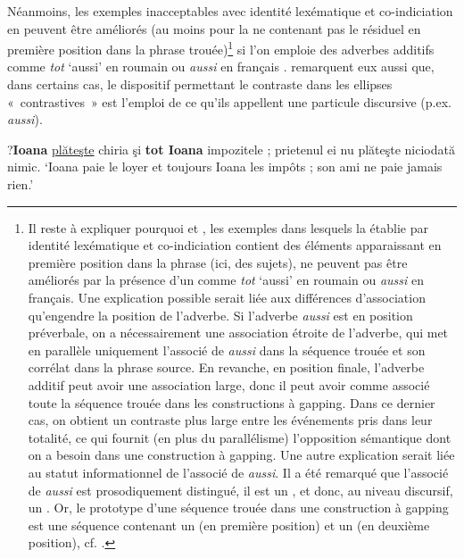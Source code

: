 Néanmoins, les exemples inacceptables avec identité lexématique et co-indicia\-tion en  peuvent être améliorés (au moins pour la  ne contenant pas le résiduel en première position dans la phrase trouée)\footnote{
Il reste à expliquer pourquoi  et , {\cad} les exemples dans lesquels la  établie par identité lexématique et co-indiciation contient des éléments apparaissant en première position dans la phrase (ici, des sujets), ne peuvent pas être améliorés par la présence d’un  comme \textit{tot} ‘aussi’ en roumain ou \textit{aussi} en français. Une explication possible serait liée aux différences d’association qu’engendre la position de l’adverbe. Si l’adverbe \textit{aussi} est en position préverbale, on a nécessairement une association étroite de l’adverbe, qui met en parallèle uniquement l’associé de \textit{aussi} dans la séquence trouée et son corrélat dans la phrase source. En revanche, en position finale, l’adverbe additif peut avoir une association large, donc il peut avoir comme associé toute la séquence trouée dans les constructions à gapping. Dans ce dernier cas, on obtient un contraste plus large entre les événements pris dans leur totalité, ce qui fournit (en plus du parallélisme) l’opposition sémantique dont on a besoin dans une construction à gapping. Une autre explication serait liée au statut informationnel de l’associé de \textit{aussi}. Il a été remarqué que l’associé de \textit{aussi} est prosodiquement distingué, {\cad} il est un , et donc, au niveau discursif, un  \citep{Jackendoff1972}. Or, le prototype d’une séquence trouée dans une construction à gapping est une séquence contenant un  (en première position) et un  (en deuxième position), cf. \citet{Winkler2005}.} si l’on emploie des adverbes additifs comme \textit{tot} ‘aussi’ en roumain  ou \textit{aussi} en français . \citet{KonietzkoEtAl2010} remarquent eux aussi que, dans certains cas, le dispositif permettant le contraste dans les ellipses «~contrastives~» est l’emploi de ce qu’ils appellent une particule discursive (p.ex. \textit{aussi}).

\largerpage
\ea \label{ch2:ex157}
\ea ?\textbf{Ioana} \uline{plăteşte} chiria şi \textbf{tot Ioana} impozitele ; prietenul ei nu plăteşte niciodată nimic. \label{ch2:ex157a}
\glt ‘Ioana paie le loyer et toujours Ioana les impôts ; son ami ne paie jamais rien.’  


